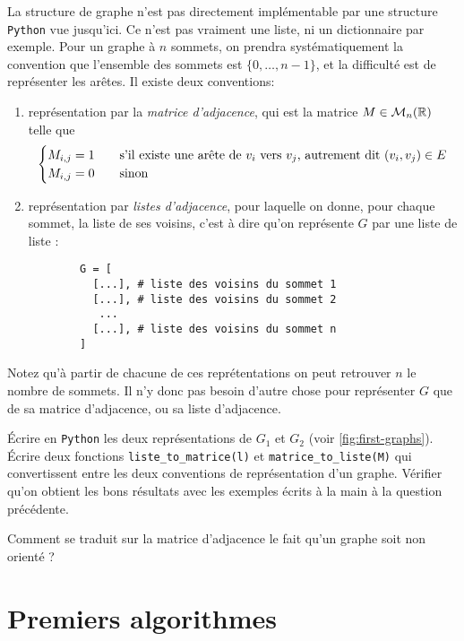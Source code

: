 La structure de graphe n'est pas directement implémentable par une structure \texttt{Python} vue jusqu'ici. Ce n'est pas vraiment une liste, ni un dictionnaire par exemple. Pour un graphe à $ n $ sommets, on prendra systématiquement la convention que l'ensemble des sommets est $ \{0, \ldots, n-1\} $, et la difficulté est de représenter les arêtes. Il existe deux conventions:
\begin{enumerate}
    \item représentation par la \textit{matrice d'adjacence}, qui est la matrice $ M \in \mathcal{M}_{n}(\mathbb{R}) $ telle que \[
        \begin{cases}
            M_{i, j} = 1 \quad &\textrm{s'il existe une arête de $ v_i $ vers $ v_j $, autrement dit $ (v_i, v_j) \in E $}\\
            M_{i, j} = 0 &\textrm{sinon}
        \end{cases}
    \]
    \item représentation par \textit{listes d'adjacence}, pour laquelle on donne, pour chaque sommet, la liste de ses voisins, c'est à dire qu'on représente $ G $ par une liste de liste :

    \begin{verbatim}
        G = [
          [...], # liste des voisins du sommet 1
          [...], # liste des voisins du sommet 2
           ...
          [...], # liste des voisins du sommet n
        ]
    \end{verbatim}
\end{enumerate}
Notez qu'à partir de chacune de ces reprétentations on peut retrouver $ n $ le nombre de sommets. Il n'y donc pas besoin d'autre chose pour représenter $ G $ que de sa matrice d'adjacence, ou sa liste d'adjacence.

\quessques Écrire en \texttt{Python} les deux représentations de $ G_1 $ et $ G_2 $ (voir \autoref{fig:first-graphs}).
\ssques Écrire deux fonctions \texttt{liste\_to\_matrice(l)} et \texttt{matrice\_to\_liste(M)} qui convertissent entre les deux conventions de représentation d'un graphe. Vérifier qu'on obtient les bons résultats avec les exemples écrits à la main à la question précédente.

\ques Comment se traduit sur la matrice d'adjacence le fait qu'un graphe soit non orienté ?

\section{Premiers algorithmes}

